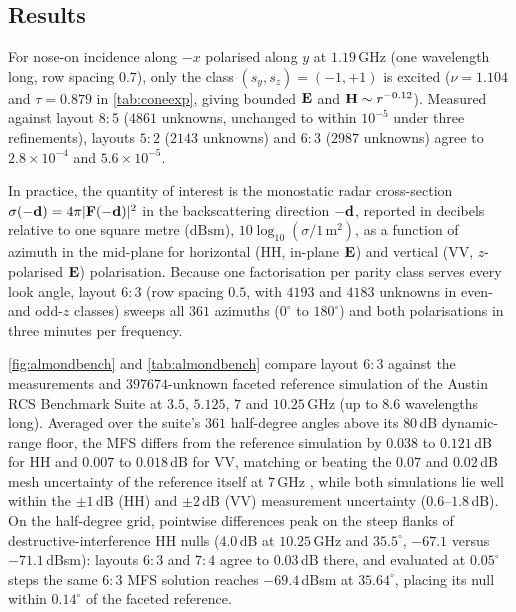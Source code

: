 \subsection{Results}

For nose-on incidence along $-x$ polarised along $y$ at $1.19$\,GHz (one wavelength long, row spacing $0.7$), only the class $(s_y,s_z) = (-1,+1)$ is excited ($\nu = 1.104$ and $\tau = 0.879$ in \autoref{tab:coneexp}, giving bounded $\mathbf{E}$ and $\mathbf{H}\sim r^{-0.12}$). Measured against layout $8{:}5$ ($4861$ unknowns, unchanged to within $10^{-5}$ under three refinements), layouts $5{:}2$ ($2143$ unknowns) and $6{:}3$ ($2987$ unknowns) agree to $2.8\times10^{-4}$ and $5.6\times10^{-5}$.

In practice, the quantity of interest is the monostatic radar cross-section $\sigma(-\mathbf{d}) = 4\pi|\mathbf{F}(-\mathbf{d})|^2$ in the backscattering direction $-\mathbf{d}$, reported in decibels relative to one square metre ($\mathrm{dBsm}$), $10\log_{10}(\sigma / 1\,\mathrm{m}^2)$, as a function of azimuth in the mid-plane for horizontal (HH, in-plane $\mathbf{E}$) and vertical (VV, $z$-polarised $\mathbf{E}$) polarisation. Because one factorisation per parity class serves every look angle, layout $6{:}3$ (row spacing $0.5$, with $4193$ and $4183$ unknowns in even- and odd-$z$ classes) sweeps all $361$ azimuths ($0^\circ$ to $180^\circ$) and both polarisations in three minutes per frequency.

\autoref{fig:almondbench} and \autoref{tab:almondbench} compare layout $6{:}3$ against the measurements and $397674$-unknown faceted reference simulation of the Austin RCS Benchmark Suite \cite{kelley2020} at $3.5$, $5.125$, $7$ and $10.25$\,GHz (up to $8.6$ wavelengths long). Averaged over the suite's $361$ half-degree angles above its $80$\,dB dynamic-range floor, the MFS differs from the reference simulation by $0.038$ to $0.121$\,dB for HH and $0.007$ to $0.018$\,dB for VV, matching or beating the $0.07$ and $0.02$\,dB mesh uncertainty of the reference itself at $7$\,GHz \cite{kelley2020}, while both simulations lie well within the $\pm1$\,dB (HH) and $\pm2$\,dB (VV) measurement uncertainty ($0.6\text{--}1.8$\,dB). On the half-degree grid, pointwise differences peak on the steep flanks of destructive-interference HH nulls ($4.0$\,dB at $10.25$\,GHz and $35.5^\circ$, $-67.1$ versus $-71.1$\,dBsm): layouts $6{:}3$ and $7{:}4$ agree to $0.03$\,dB there, and evaluated at $0.05^\circ$ steps the same $6{:}3$ MFS solution reaches $-69.4$\,dBsm at $35.64^\circ$, placing its null within $0.14^\circ$ of the faceted reference.

